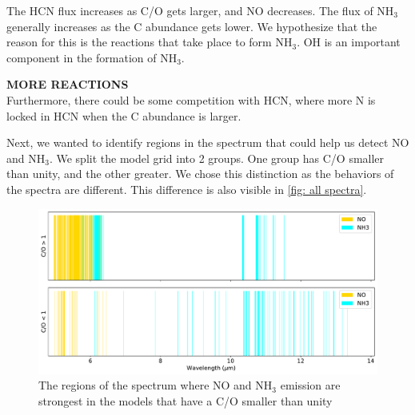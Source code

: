 \documentclass[twoside, single, authoryear, semicolon]{lion-msc}
\newcommand{\4}{$_4$}
\newcommand{\3}{$_3$}
\newcommand{\2}{$_2$}
\begin{document}
The HCN flux increases as C/O gets larger, and NO decreases. The flux of NH\3 generally increases as the C abundance gets lower. We hypothesize that the reason for this is the reactions that take place to form NH\3.
OH is an important component in the formation of NH\3.


\textbf{MORE REACTIONS}\\
Furthermore, there could be some competition with HCN, where more N is locked in HCN when the C abundance is larger. 

Next, we wanted to identify regions in the spectrum that could help us detect NO and NH\3. We split the model grid into 2 groups. One group has C/O smaller than unity, and the other greater. We chose this distinction as the behaviors of the spectra are different. This difference is also visible in \autoref{fig: all spectra}. 



\begin{figure}[!ht]
    \centering
    \includegraphics[width=\linewidth]{Figures/ClassificationCO.pdf}
    \caption{The regions of the spectrum where NO and NH\3 emission are strongest in the models that have a C/O smaller than unity}
    \label{fig: classes}
\end{figure}
\end{document}
